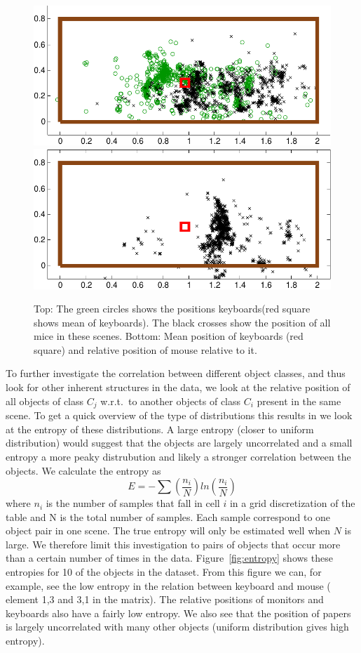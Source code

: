 \documentclass[letterpaper, 10 pt, conference]{ieeeconf}  %
\begin{document}
\begin{figure}
\begin{center}
\includegraphics[width=0.8\linewidth]{keyboard_mouse_raw-crop}
\includegraphics[width=0.8\linewidth]{keyboard_mouse-crop}
\end{center}
\caption{Top: The green circles shows the positions keyboards(red square shows mean of keyboards). The black crosses show the position of all mice in these scenes. Bottom: Mean position of keyboards (red square) and relative position of mouse relative to it.} 
\label{fig:scatter-keyboard-mouse}
\end{figure}

To further investigate the correlation between different object classes, and thus look for other inherent structures in the data, we look at 
the relative position of all objects of class $C_j$ w.r.t.\ to another objects of class $C_i$ present in the same scene. To get a quick 
overview of the type of distributions this results in we look at the entropy of these distributions. A large entropy (closer to uniform 
distribution) would suggest that the objects are largely uncorrelated and a small entropy a more peaky distrubution and likely a stronger 
correlation between the objects. We calculate the entropy as 
\begin{equation}
E=-\sum (\frac{n_i}{N})ln(\frac{n_i}{N})
\end{equation}
where $n_i$ is the number of samples that fall in cell $i$ in a grid discretization of the table and N is the total number of samples. Each 
sample correspond to one object pair in one scene. The true entropy will only be estimated well when $N$ is large. We therefore limit this 
investigation to pairs of objects that occur more than a certain number of times in the data. Figure~\ref{fig:entropy} shows these entropies 
for 10 of the objects in the dataset. From this figure we can, for example, see the low entropy in the relation between keyboard and mouse (
element 1,3 and 3,1 in the matrix). The relative positions of monitors and keyboards also have a fairly low entropy. We also see that the 
position of papers is largely uncorrelated with many other objects (uniform distribution gives high entropy). 
\end{document}
